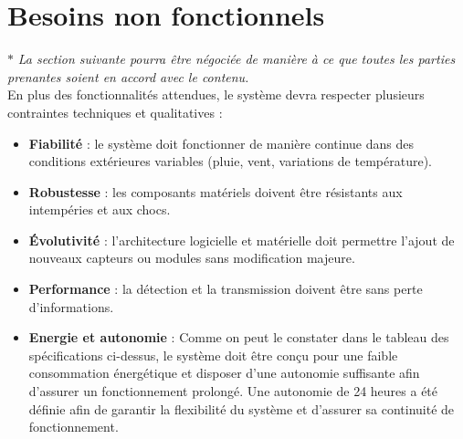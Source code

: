 \section{Besoins non fonctionnels}

$ \ast $ \textit{La section suivante pourra être négociée de manière à ce que toutes les parties prenantes soient en accord avec le contenu.} \\

En plus des fonctionnalités attendues, le système devra respecter plusieurs contraintes techniques et qualitatives :


\small
\begin{itemize}
   \item \textbf{Fiabilité} : le système doit fonctionner de manière continue dans des conditions extérieures variables (pluie, vent, variations de température).
   \item \textbf{Robustesse} : les composants matériels doivent être résistants aux intempéries et aux chocs.
   \item \textbf{Évolutivité} : l’architecture logicielle et matérielle doit permettre l’ajout de nouveaux capteurs ou modules sans modification majeure.
   \item \textbf{Performance} : la détection et la transmission doivent être sans perte d’informations.
   \item \textbf{Energie et autonomie} : Comme on peut le constater dans le tableau des spécifications ci-dessus, le système doit être conçu pour une faible consommation énergétique et disposer d’une autonomie suffisante afin d’assurer un fonctionnement prolongé. Une autonomie de 24 heures a été définie afin de garantir la flexibilité du système et d’assurer sa continuité de fonctionnement.
\end{itemize}